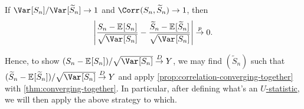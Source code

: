 \begin{proposition}\label{prop:correlation-converging-together}
	If \(\Var_{}[S_n] / \Var_{}[\widetilde{S} _n] \to 1\) and \(\Corr_{}(S_n, \widetilde{S} _n) \to 1\), then
	\[
		\left\vert \frac{S_n - \mathbb{E}_{}[S_n] }{\sqrt{\Var_{}[S_n] } } - \frac{\widetilde{S} _n - \mathbb{E}_{}[\widetilde{S} _n] }{\sqrt{\Var_{}[S_n] } } \right\vert
		\overset{p}{\to} 0.
	\]
\end{proposition}

Hence, to show \((S_n - \mathbb{E}_{}[S_n] ) / \sqrt{\Var_{}[S_n] } \overset{D}{\to} Y\), we may find \((\widetilde{S} _n)\) such that \((\widetilde{S} _n - \mathbb{E}_{}[\widetilde{S} _n]) / \sqrt{\Var_{}[S_n] } \overset{D}{\to} Y\) and apply \autoref{prop:correlation-converging-together} with \autoref{thm:converging-together}. In particular, after defining what's an \hyperref[def:U-statistic]{\(U\)-statistic}, we will then apply the above strategy to which.
